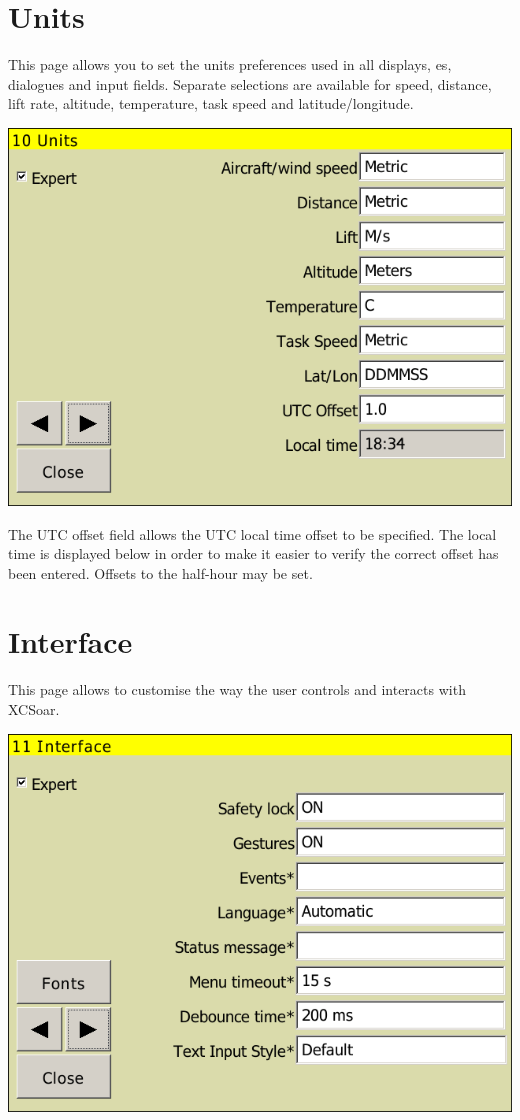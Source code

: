 \clearpage
\section{Units}

This page allows you to set the units preferences used in all
displays, {\InfoBox}es, dialogues and input fields.  Separate selections
are available for speed, distance, lift rate, altitude, temperature, task
speed and latitude/longitude.

\begin{center}
\includegraphics[angle=0,width=0.8\linewidth,keepaspectratio='true']{figures/config-units.png}
\end{center}

The UTC offset field allows the UTC local time offset to be specified.
The local time is displayed below in order to make it easier to verify
the correct offset has been entered.  Offsets to the half-hour may be
set.



\clearpage
\section{Interface}\label{sec:interface}

This page allows to customise the way the user controls and interacts with
XCSoar.

\begin{center}
\includegraphics[angle=0,width=0.8\linewidth,keepaspectratio='true']{figures/config-interface.png}
\end{center}

